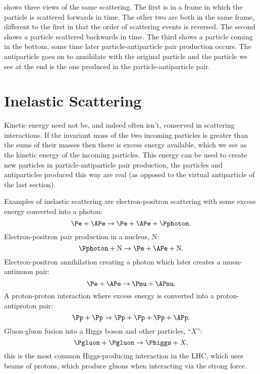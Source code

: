 \documentclass[fleqn]{NotesClass}
\begin{document}
     shows three views of the same scattering.
    The first is in a frame in which the particle is scattered forwards in time.
    The other two are both in the same frame, different to the first in that the order of scattering events is reversed.
    The second shows a particle scattered backwards in time.
    The third shows a particle coming in the bottom, some time later particle-antiparticle pair production occurs.
    The antiparticle goes on to annihilate with the original particle and the particle we see at the end is the one produced in the particle-antiparticle pair.
    
    \section{Inelastic Scattering}
    Kinetic energy need not be, and indeed often isn't, conserved in scattering interactions.
    If the invariant mass of the two incoming particles is greater than the sums of their masses then there is excess energy available, which we see as the kinetic energy of the incoming particles.
    This energy can be used to create new particles in particle-antiparticle pair production, the particles and antiparticles produced this way are real (as opposed to the virtual antiparticle of the last section).
    
    Examples of inelastic scattering are electron-positron scattering with some excess energy converted into a photon:
    \begin{equation}
        \Pe + \APe \to \Pe + \APe + \Pphoton.
    \end{equation}
    Electron-positron pair production in a nucleus, \(\mathrm{N}\):
    \begin{equation}
        \Pphoton + \mathrm{N} \to \Pe + \APe + \mathrm{N}.
    \end{equation}
    Electron-positron annihilation creating a photon which later creates a muon-antimuon pair:
    \begin{equation}
        \Pe + \APe \to \Pmu + \APmu.
    \end{equation}
    A proton-proton interaction where excess energy is converted into a proton-antiproton pair:
    \begin{equation}
        \Pp + \Pp \to \Pp + \Pp + \Pp + \APp.
    \end{equation}
    Gluon-gluon fusion into a Higgs boson and other particles, \enquote{\(X\)}:
    \begin{equation}
        \Pgluon + \Pgluon \to \Phiggs + X,
    \end{equation}
    this is the most common Higgs-producing interaction in the LHC, which uses beams of protons, which produce gluons when interacting via the strong force.
    
\end{document}
